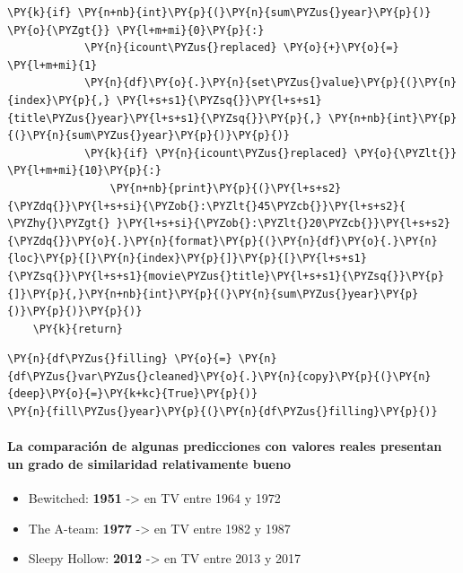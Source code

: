 \begin{tcolorbox}[breakable, size=fbox, boxrule=1pt, pad at break*=1mm,colback=cellbackground, colframe=cellborder]
\begin{Verbatim}[commandchars=\\\{\}]
        \PY{k}{if} \PY{n+nb}{int}\PY{p}{(}\PY{n}{sum\PYZus{}year}\PY{p}{)} \PY{o}{\PYZgt{}} \PY{l+m+mi}{0}\PY{p}{:}
            \PY{n}{icount\PYZus{}replaced} \PY{o}{+}\PY{o}{=} \PY{l+m+mi}{1}
            \PY{n}{df}\PY{o}{.}\PY{n}{set\PYZus{}value}\PY{p}{(}\PY{n}{index}\PY{p}{,} \PY{l+s+s1}{\PYZsq{}}\PY{l+s+s1}{title\PYZus{}year}\PY{l+s+s1}{\PYZsq{}}\PY{p}{,} \PY{n+nb}{int}\PY{p}{(}\PY{n}{sum\PYZus{}year}\PY{p}{)}\PY{p}{)}
            \PY{k}{if} \PY{n}{icount\PYZus{}replaced} \PY{o}{\PYZlt{}} \PY{l+m+mi}{10}\PY{p}{:} 
                \PY{n+nb}{print}\PY{p}{(}\PY{l+s+s2}{\PYZdq{}}\PY{l+s+si}{\PYZob{}:\PYZlt{}45\PYZcb{}}\PY{l+s+s2}{ \PYZhy{}\PYZgt{} }\PY{l+s+si}{\PYZob{}:\PYZlt{}20\PYZcb{}}\PY{l+s+s2}{\PYZdq{}}\PY{o}{.}\PY{n}{format}\PY{p}{(}\PY{n}{df}\PY{o}{.}\PY{n}{loc}\PY{p}{[}\PY{n}{index}\PY{p}{]}\PY{p}{[}\PY{l+s+s1}{\PYZsq{}}\PY{l+s+s1}{movie\PYZus{}title}\PY{l+s+s1}{\PYZsq{}}\PY{p}{]}\PY{p}{,}\PY{n+nb}{int}\PY{p}{(}\PY{n}{sum\PYZus{}year}\PY{p}{)}\PY{p}{)}\PY{p}{)}
    \PY{k}{return} 
\end{Verbatim}
\end{tcolorbox}

    \begin{tcolorbox}[breakable, size=fbox, boxrule=1pt, pad at break*=1mm,colback=cellbackground, colframe=cellborder]
\begin{Verbatim}[commandchars=\\\{\}]
\PY{n}{df\PYZus{}filling} \PY{o}{=} \PY{n}{df\PYZus{}var\PYZus{}cleaned}\PY{o}{.}\PY{n}{copy}\PY{p}{(}\PY{n}{deep}\PY{o}{=}\PY{k+kc}{True}\PY{p}{)}
\PY{n}{fill\PYZus{}year}\PY{p}{(}\PY{n}{df\PYZus{}filling}\PY{p}{)}
\end{Verbatim}
\end{tcolorbox}

    \paragraph{La comparación de algunas predicciones con valores reales
presentan un grado de similaridad relativamente
bueno}\label{la-comparaciuxf3n-de-algunas-predicciones-con-valores-reales-presentan-un-grado-de-similaridad-relativamente-bueno}

\begin{itemize}
\tightlist
\item
  Bewitched: \textbf{1951} -\textgreater{} en TV entre 1964 y 1972
\item
  The A-team: \textbf{1977} -\textgreater{} en TV entre 1982 y 1987
\item
  Sleepy Hollow: \textbf{2012} -\textgreater{} en TV entre 2013 y 2017
\end{itemize}

